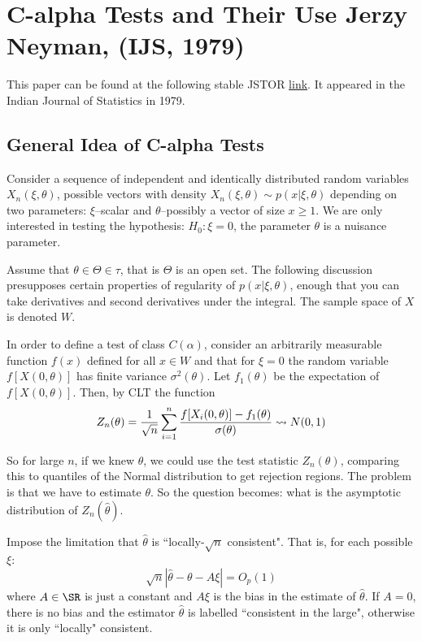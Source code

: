 \section{C-alpha Tests and Their Use {\small Jerzy Neyman, (IJS, 1979)}}


This paper can be found at the following stable JSTOR \href{https://www.jstor.org/stable/25050174}{link}. It appeared in the Indian Journal of Statistics in 1979.  

\subsection{General Idea of C-alpha Tests}%
\label{subsec:neyman-2}

Consider a sequence of independent and identically distributed random variables \(X_n(\xi,\theta)\), possible vectors with density \(X_n(\xi,\theta) \sim p(x|\xi,\theta)\) depending on two parameters: \(\xi\)--scalar and \(\theta\)--possibly a vector of size \(x \geq 1\). We are only interested in testing the hypothesis: \(H_0:\xi=0\), the parameter \(\theta\) is a nuisance parameter.

Assume that \(\theta \in \Theta \in \tau\), that is  \(\Theta\) is an open set. The following discussion presupposes certain properties of regularity of \(p(x|\xi,\theta)\), enough that you can take derivatives and second derivatives under the integral. The sample space of \(X\) is denoted \(W\). 

In order to define a test of class \(C(\alpha)\), consider an arbitrarily measurable function  \(f(x)\) defined for all  \(x\in W\) and that for \(\xi=0\) the random variable \(f[X(0,\theta)]\) has finite variance \(\sigma^2(\theta)\). Let \(f_1(\theta)\) be the expectation of \(f[X(0,\theta)]\). Then, by CLT the function
\begin{equation}
	\label{eq:neyman-1}
	Z_n(\theta) = \frac{1}{\sqrt{n}} \sum_{i=1}^n \frac{f[X_i(0,\theta)]-f_1(\theta)}{\sigma(\theta)}  \rightsquigarrow N(0,1)
\end{equation}

So for large \(n\), if we knew \(\theta\), we could use the test statistic  \(Z_n(\theta)\), comparing this to quantiles of the  Normal distribution to get rejection regions. The problem is that we have to estimate \(\theta\). So the question becomes: what is the asymptotic distribution of \(Z_n(\hat \theta)\).

Impose the limitation that \(\hat\theta\) is ``locally-\(\sqrt{n}\) consistent". That is, for each possible \(\xi\):
\begin{equation}
	\label{eq:neyman-3}
	\sqrt{n}\left|\hat\theta-\theta-A\xi\right| = O_p(1)
\end{equation}
where \(A \in \SR\) is just a constant and \(A\xi\) is the bias in the estimate of \(\hat\theta\). If \(A=0\), there is no bias and the estimator \(\hat\theta\) is labelled ``consistent in the large", otherwise it is only ``locally" consistent.

